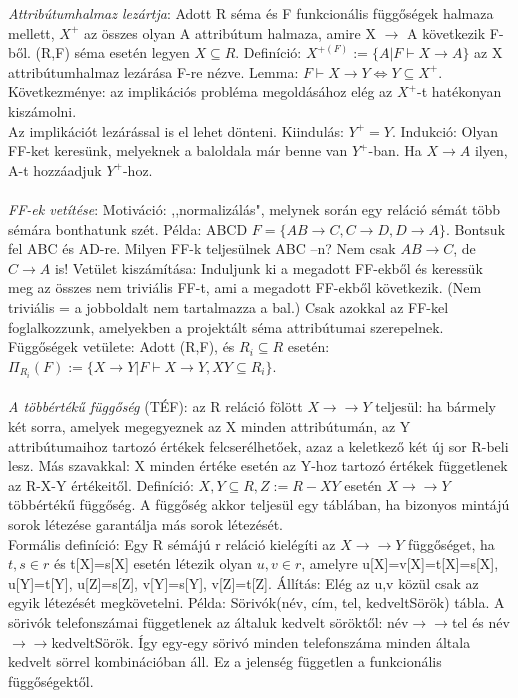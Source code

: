 \documentclass[margin=0px]{article}
\begin{document}
	\textit{Attribútumhalmaz lezártja}: Adott R séma és F funkcionális függőségek halmaza mellett, $X^+$ az összes olyan A attribútum halmaza, amire X $\to$ A következik F-ből. (R,F) séma esetén legyen $X \subseteq R$. Definíció: $X^{+(F)}:=\{A | F \vdash X \to A\}$ az X attribútumhalmaz lezárása F-re nézve. Lemma: $F \vdash X \to Y \iff Y \subseteq X^+$. Következménye: az implikációs probléma megoldásához elég az $X^+$-t hatékonyan kiszámolni. \\
	Az implikációt lezárással is el lehet dönteni. Kiindulás: $Y^+ = Y$. Indukció: Olyan FF-ket keresünk, melyeknek a baloldala már benne van $Y^+$-ban. Ha $X \to A$ ilyen, A-t hozzáadjuk $Y^+$-hoz. \\\\
	\textit{FF-ek vetítése}: Motiváció: ,,normalizálás", melynek során egy reláció sémát több sémára bonthatunk szét. Példa: ABCD $F=\{AB \to C, C \to D, D \to A\}$. Bontsuk fel ABC és AD-re. Milyen FF-k teljesülnek ABC –n? Nem csak $AB \to C$, de $C \to A$ is! Vetület kiszámítása: Induljunk ki a megadott FF-ekből és keressük meg az összes nem triviális FF-t, ami a megadott FF-ekből következik. (Nem triviális = a jobboldalt nem tartalmazza a bal.) Csak azokkal az FF-kel foglalkozzunk, amelyekben a projektált séma attribútumai szerepelnek. Függőségek vetülete: Adott (R,F), és $R_i \subseteq R $ esetén: $\Pi_{R_i}(F):=\{X \to Y | F \vdash X \to Y, XY \subseteq R_i\}$.\\ \\
	\textit{A többértékű függőség} (TÉF): az R reláció fölött $X \to\to Y$ teljesül: ha bármely két sorra, amelyek megegyeznek az X minden attribútumán, az Y attribútumaihoz tartozó értékek felcserélhetőek, azaz a keletkező két új sor R-beli lesz. Más szavakkal: X minden értéke esetén az Y-hoz tartozó értékek függetlenek az R-X-Y értékeitől. Definíció: $X,Y \subseteq R, Z:=R-XY$ esetén $X \to\to Y$ többértékű függőség. A függőség akkor teljesül egy táblában, ha bizonyos mintájú sorok létezése garantálja más sorok létezését. \\
	Formális definíció: Egy R sémájú r reláció kielégíti az $X \to\to Y$ függőséget, ha $t,s \in r$ és t[X]=s[X] esetén létezik olyan $u,v \in r$, amelyre u[X]=v[X]=t[X]=s[X], u[Y]=t[Y], u[Z]=s[Z],
	v[Y]=s[Y], v[Z]=t[Z]. Állítás: Elég az u,v közül csak az egyik létezését megkövetelni.
	Példa: Sörivók(név, cím, tel, kedveltSörök) tábla. A sörivók telefonszámai függetlenek az általuk kedvelt söröktől: név$\to\to$tel és név$\to\to$kedveltSörök. Így egy-egy sörivó minden telefonszáma minden általa kedvelt sörrel kombinációban áll. Ez a jelenség független a funkcionális függőségektől. \\
\end{document}
